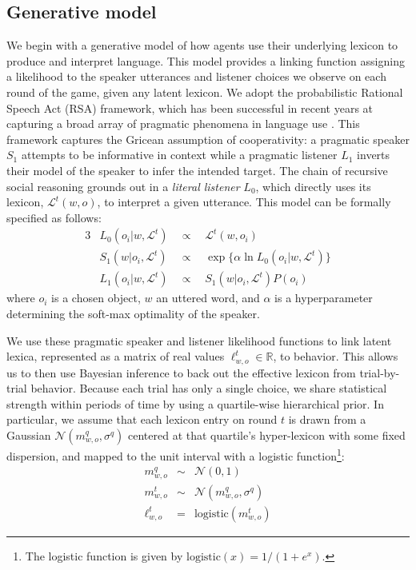 \documentclass[10pt,letterpaper]{article}
\begin{document}
\subsection{Generative model}

We begin with a generative model of how agents use their underlying lexicon to produce and interpret language. This model provides a linking function assigning a likelihood to the speaker utterances and listener choices we observe on each round of the game, given any latent lexicon. We adopt the probabilistic Rational Speech Act (RSA) framework, which has been successful in recent years at capturing a broad array of pragmatic phenomena in language use \cite{FrankGoodman12_PragmaticReasoningLanguageGames,GoodmanFrank16_RSATiCS,FrankeJager16_ProbabilisticPragmatics}. This framework captures the Gricean assumption of cooperativity: a pragmatic speaker $S_1$ attempts to be informative in context while a pragmatic listener $L_1$ inverts their model of the speaker to infer the intended target. The chain of recursive social reasoning grounds out in a \emph{literal listener} $L_0$, which directly uses its lexicon, $\mathcal{L}^t(w,o)$, to interpret a given utterance. This model can be formally specified as follows:
\begin{alignat*}{3}
& L_0(o_i | w, \mathcal{L}^t) &\ \ \propto \ \ & \mathcal{L}^t(w,o_i) \\
& S_1(w | o_i, \mathcal{L}^t) &\ \ \propto \ \ & \exp\{\alpha \ln L_0(o_i | w, \mathcal{L}^t)\} \\
& L_1(o_i | w, \mathcal{L}^t) &\ \ \propto \ \ & S_1(w | o_i, \mathcal{L}^t) P(o_i) 
\end{alignat*}
where $o_i$ is a chosen object, $w$ an uttered word, and $\alpha$ is a hyperparameter determining the soft-max optimality of the speaker. 

We use these pragmatic speaker and listener likelihood functions to link latent lexica, represented as a matrix of real values $\ell_{w,o}^t \in \mathbb{R}$, to behavior.
This allows us to then use Bayesian inference to back out the effective lexicon from trial-by-trial behavior.
Because each trial has only a single choice, we share statistical strength within periods of time by using a quartile-wise hierarchical prior. 
In particular, we assume that each lexicon entry on round $t$ is drawn from a Gaussian $\mathcal{N}(m^{q}_{w,o}, \sigma^{q})$ centered at that quartile's hyper-lexicon with some fixed dispersion, and mapped to the unit interval with a logistic function\footnote{The logistic function is given by $\text{logistic}(x) = 1/(1 + e^{x})$.}:
$$
\begin{array}{rcl}
m_{w,o}^q &\sim& \mathcal{N}(0, 1)\\
m_{w,o}^t &\sim& \mathcal{N}(m_{w,o}^q,  \sigma^{q})\\
\ell_{w,o}^t &=& \text{logistic}(m_{w,o}^t)
\end{array}
$$
\end{document}
